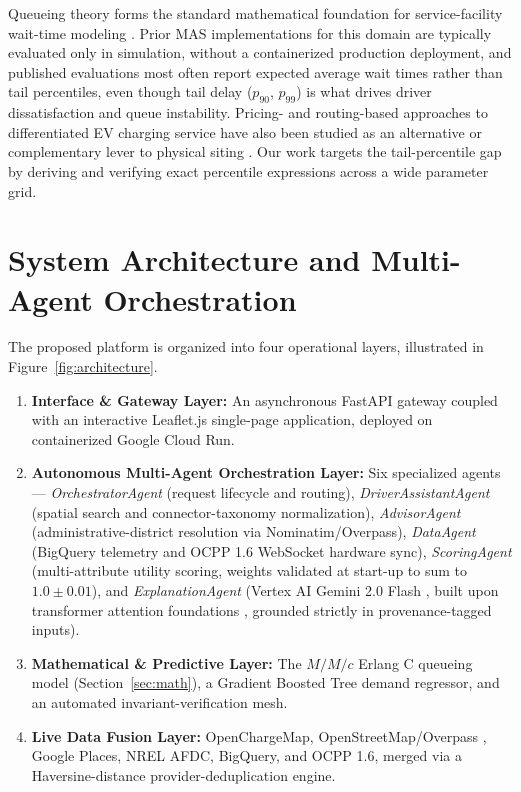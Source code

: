 \documentclass[preprint,12pt,authoryear]{elsarticle}
\begin{document}
Queueing theory forms the standard mathematical foundation for service-facility wait-time modeling \citep{erlang1917solution,shortle2018fundamentals}. Prior MAS implementations for this domain are typically evaluated only in simulation, without a containerized production deployment, and published evaluations most often report expected average wait times rather than tail percentiles, even though tail delay ($p_{90}$, $p_{99}$) is what drives driver dissatisfaction and queue instability. Pricing- and routing-based approaches to differentiated EV charging service have also been studied as an alternative or complementary lever to physical siting \citep{moradipari2020pricing}. Our work targets the tail-percentile gap by deriving and verifying exact percentile expressions across a wide parameter grid.

\section{System Architecture and Multi-Agent Orchestration}
\label{sec:architecture}
The proposed platform is organized into four operational layers, illustrated in Figure~\ref{fig:architecture}.
\begin{enumerate}
    \item \textbf{Interface \& Gateway Layer:} An asynchronous FastAPI gateway \citep{tiangolo2018fastapi} coupled with an interactive Leaflet.js single-page application, deployed on containerized Google Cloud Run.
    \item \textbf{Autonomous Multi-Agent Orchestration Layer:} Six specialized agents --- \textit{OrchestratorAgent} (request lifecycle and routing), \textit{DriverAssistantAgent} (spatial search and connector-taxonomy normalization), \textit{AdvisorAgent} (administrative-district resolution via Nominatim/Overpass), \textit{DataAgent} (BigQuery telemetry and OCPP 1.6 WebSocket hardware sync), \textit{ScoringAgent} (multi-attribute utility scoring, weights validated at start-up to sum to $1.0\pm0.01$), and \textit{ExplanationAgent} (Vertex AI Gemini 2.0 Flash \citep{team2024gemini}, built upon transformer attention foundations \citep{vaswani2017attention,achiam2023gpt4}, grounded strictly in provenance-tagged inputs).
    \item \textbf{Mathematical \& Predictive Layer:} The $M/M/c$ Erlang C queueing model (Section~\ref{sec:math}), a Gradient Boosted Tree demand regressor, and an automated invariant-verification mesh.
    \item \textbf{Live Data Fusion Layer:} OpenChargeMap, OpenStreetMap/Overpass \citep{haklay2008openstreetmap}, Google Places, NREL AFDC, BigQuery, and OCPP 1.6, merged via a Haversine-distance provider-deduplication engine.
\end{enumerate}
\end{document}
